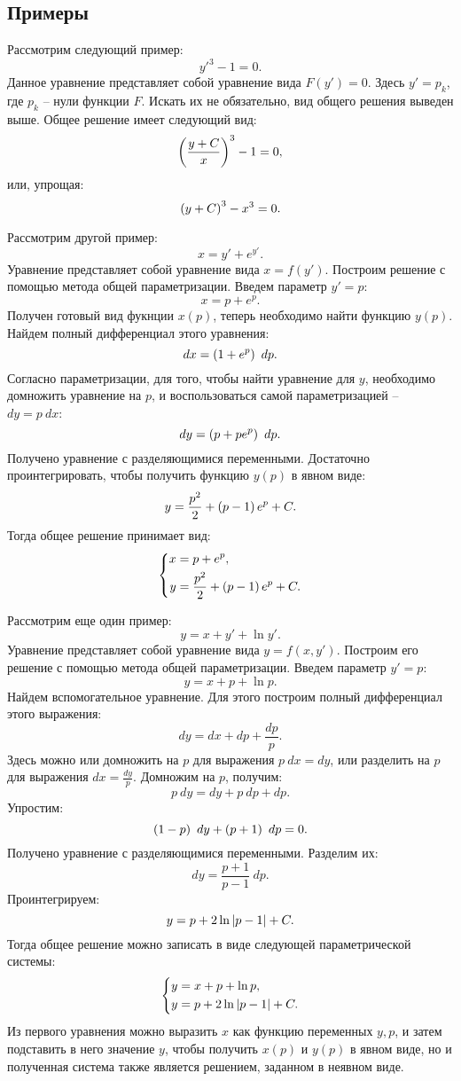 	\subsection{Примеры}

		Рассмотрим следующий пример:
		\[ y'^3 - 1 = 0. \]
		Данное уравнение представляет собой уравнение вида $F(y') = 0$. Здесь $y' = p_k$, где $p_k$ -- нули функции $F$. Искать их не обязательно, вид общего решения выведен выше. Общее решение имеет следующий вид:
		\[ \left( \frac{y + C}{x} \right)^3 - 1 = 0, \]
		или, упрощая:
		\[ \left( y + C \right)^3 - x^3 = 0. \]

		Рассмотрим другой пример:
		\[ x = y' + e^{y'}. \]
		Уравнение представляет собой уравнение вида $x = f(y')$. Построим решение с помощью метода общей параметризации. Введем параметр $y' = p$:
		\[ x = p + e^p. \]
		Получен готовый вид фукнции $x(p)$, теперь необходимо найти функцию $y(p)$. Найдем полный дифференциал этого уравнения:
		\[ dx = \left( 1 + e^{p} \right) ~ dp. \]
		Согласно параметризации, для того, чтобы найти уравнение для $y$, необходимо домножить уравнение на $p$, и воспользоваться самой параметризацией -- $dy = p ~ dx$:
		\[ dy = \left( p + pe^{p} \right) ~ dp. \]
		Получено уравнение с разделяющимися переменными. Достаточно проинтегрировать, чтобы получить функцию $y(p)$ в явном виде:
		\[ y = \frac{p^2}{2} + \left( p - 1 \right) e^{p} + C. \]
		Тогда общее решение принимает вид:
		\[ \left\lbrace \begin{split} x &= p + e^{p}, \\ y &= \frac{p^2}{2} + \left( p-1 \right) e^{p} + C. \end{split} \right. \]

		Рассмотрим еще один пример:
		\[ y = x + y' + \ln{y'}. \]
		Уравнение представляет собой уравнение вида $y = f(x, y')$. Построим его решение с помощью метода общей параметризации. Введем параметр $y' = p$:
		\[ y = x + p + \ln{p}. \]
		Найдем вспомогательное уравнение. Для этого построим полный дифференциал этого выражения:
		\[ dy = dx + dp + \frac{dp}{p}. \]
		Здесь можно или домножить на $p$ для выражения $p ~ dx = dy$, или разделить на $p$ для выражения $dx = \frac{dy}{p}$. Домножим на $p$, получим:
		\[ p ~ dy = dy + p ~ dp + dp. \]
		Упростим:
		\[ \left( 1 - p \right) ~ dy + \left( p + 1 \right) ~ dp = 0. \]
		Получено уравнение с разделяющимися переменными. Разделим их:
		\[ dy = \frac{p + 1}{p - 1} ~ dp. \]
		Проинтегрируем:
		\[ y = p + 2\ln\left\vert p - 1 \right\vert + C. \]
		Тогда общее решение можно записать в виде следующей параметрической системы:
		\[ \left\lbrace \begin{split} y &= x + p + \ln{p}, \\ y &= p + 2 \ln\left\vert p-1 \right\vert + C. \end{split} \right. \]
		Из первого уравнения можно выразить $x$ как функцию переменных $y, p$, и затем подставить в него значение $y$, чтобы получить $x(p)$ и $y(p)$ в явном виде, но и полученная система также является решением, заданном в неявном виде.

	\pagebreak